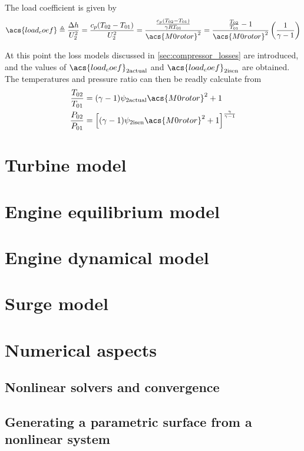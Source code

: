 \documentclass[tcc]{subfiles}
\begin{document}
The load coefficient is given by
\begin{equation}
    \acs{load_coef}\triangleq \frac{\Delta h}{U_2^2}
                      = \frac{c_p(T_{02}-T_{01})}{U_2^2}
                      = \frac{\frac{c_p(T_{02}-T_{01})}{\gamma R T_{01}}}
                                    {\acs{M0rotor}^2}
                      = \frac{\frac{T_{02}}{T_{01}}-1}
                                  {\acs{M0rotor}^2}
                        \left(\frac{1}{\gamma-1}\right)
\end{equation}

At this point the loss models discussed in \cref{sec:compressor_losses} are introduced, 
and the values of $\acs{load_coef}_{2\text{actual}}$ and $\acs{load_coef}_{2\text{isen}}$ are obtained.
The temperatures and pressure ratio can then be readly calculate from
\begin{align}
    \label{eqn:psi2Tratio}
    \frac{T_{02}}{T_{01}} &= (\gamma - 1)\psi_{2\text{actual}} \acs{M0rotor}^2 + 1 \\
    \label{eqn:psi2Pratio}
    \frac{P_{02}}{P_{01}} &= \left[(\gamma - 1)\psi_{2\text{isen}} \acs{M0rotor}^2 + 1\right]^\frac{\gamma}{\gamma-1}
\end{align}


\section{Turbine model}
\section{Engine equilibrium model}
\section{Engine dynamical model}
\section{Surge model}
\section{Numerical aspects}
\subsection{Nonlinear solvers and convergence}
\subsection{Generating a parametric surface from a nonlinear system}
\end{document}
